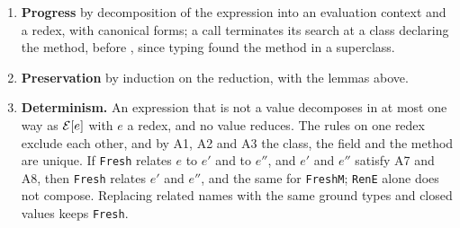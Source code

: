 \begin{enumerate}
\item \textbf{Progress} by decomposition of the expression into an evaluation context and a redex, with canonical forms; a call terminates its search at a class declaring the method, before \Q@Object@, since typing found the method in a superclass.
\item \textbf{Preservation} by induction on the reduction, with the lemmas above.
\item \textbf{Determinism.} An expression that is not a value decomposes in at most one way as $\mathcal{E}[e]$ with $e$ a redex, and no value reduces.
The rules on one redex exclude each other, and by A1, A2 and A3 the class, the field and the method are unique.
If \texttt{Fresh} relates $e$ to $e'$ and to $e''$, and $e'$ and $e''$ satisfy A7 and A8, then \texttt{Fresh} relates $e'$ and $e''$, and the same for \texttt{FreshM}; \texttt{RenE} alone does not compose.
Replacing related names with the same ground types and closed values keeps \texttt{Fresh}.
\end{enumerate}


